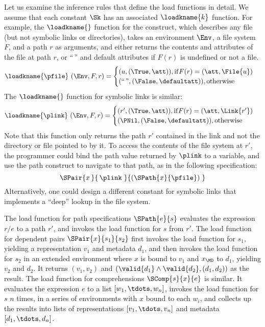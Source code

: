 Let us examine the inference rules that define the load functions in
detail. We assume that each constant $\Sk$ has an associated
$\loadkname{k}$ function. For example, the $\loadkname{}$ function for
the \pfile{} construct, which describes any file (but not symbolic
links or directories), takes an environment $\Env$, a file system $F$,
and a path $r$ as arguments, and either returns the contents and
attributes of the file at path $r$, or ``$\,$'' and default attributes
if $F(r)$ is undefined or not a file.
%
\[
\loadkname{\pfile}~(\Env,F,r) =
\begin{cases}
  (u,(\True,\att)), \mathrm{if } F(r) = (\att,\File{u}) \\
  (\text{``}{\,}\text{''},(\False,\defaultatt)), \mathrm{otherwise}\\
\end{cases}
\]
%
The $\loadkname{}$ function for symbolic links is similar:
%
\[
\loadkname{\plink}~(\Env,F,r) =
\begin{cases}
  (r',(\True,\att)), \mathrm{if } F(r) = (\att,\Link{r'}) \\
  (\PNil,(\False,\defaultatt)), \mathrm{otherwise}\\
\end{cases}
\]
%
Note that this function only returns the path $r'$ contained in the
link and not the directory or file pointed to by it. To access the
contents of the file system at $r'$, the programmer could bind the
path value returned by $\plink$ to a variable, and use the path
construct to navigate to that path, as in the following specification:
%
\[
\SPair{x\,}{\,\plink\;}{(\SPath{x}{\pfile})\;}
\]
%
Alternatively, one could design a different constant for symbolic
links that implements a ``deep'' lookup in the file system.

The load function for path specifications $\SPath{e}{s}$ evaluates the
expression $r/e$ to a path $r'$, and invokes the load function for $s$
from $r'$. The load function for dependent pairs $\SPair{x}{s_1}{s_2}$
first invokes the load function for $s_1$, yielding a representation
$v_1$ and metadata $d_1$, and then invokes the load function for $s_2$
in an extended environment where $x$ is bound to $v_1$ and $x_{\MD}$
to $d_1$, yielding $v_2$ and $d_2$. It returns $(v_1,v_2)$ and
%
$(\valid{d_1} \wedge \valid{d_2},(d_1,d_2))$
%
as the result. The load function for comprehensions $\SComp{s}{x}{e}$
is similar. It evaluates the expression $e$ to a list
$[w_1,\tdots,w_n]$, invokes the load function for $s$ $n$ times, in a
series of environments with $x$ bound to each $w_i$, and collects up
the results into lists of representations $[v_1,\tdots,v_n]$ and
metadata $[d_1,\tdots,d_n]$.

